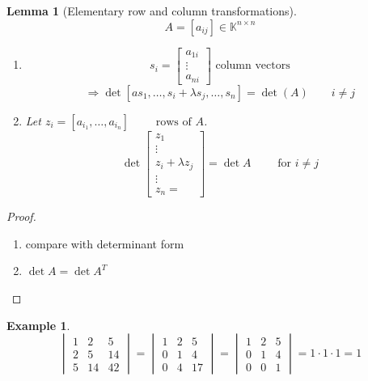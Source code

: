 \documentclass[a4paper,landscape,twocolumn]{article}
\newtheorem{ex}{Example}
\newtheorem{lemma}{Lemma}
\begin{document}
\begin{lemma}[Elementary row and column transformations]
  \label{lemma-7.33}
  \[ A = [a_{ij}] \in \mathbb K^{n \times n} \]
  \begin{enumerate}
    \item
      \[ s_i = \begin{bmatrix} a_{1i} \\ \vdots \\ a_{ni }\end{bmatrix} \text{ column vectors} \]
      \[ \Rightarrow \det[as_1, \ldots, s_i + \lambda s_j, \ldots, s_n] = \det(A) \qquad i \neq j \]
    \item
      Let $z_i = [a_{i_1}, \ldots, a_{i_n}] \qquad \text{ rows of $A$}$.
      \[ \det\begin{bmatrix} z_1 \\ \vdots \\ z_i + \lambda z_j \\ \vdots \\ z_n = \end{bmatrix} = \det{A} \qquad \text{ for } i \neq j \]
  \end{enumerate}
\end{lemma}
\begin{proof}
  \begin{enumerate}
    \item compare with determinant form
    \item $\det{A} = \det{A^T}$
  \end{enumerate}
\end{proof}

\begin{ex}
  \label{example-7.34}
  \[
    \begin{vmatrix}
      1 & 2 & 5 \\
      2 & 5 & 14 \\
      5 & 14 & 42
    \end{vmatrix}
    =
    \begin{vmatrix}
      1 & 2 & 5 \\
      0 & 1 & 4 \\
      0 & 4 & 17
    \end{vmatrix}
    =
    \begin{vmatrix}
      1 & 2 & 5 \\
      0 & 1 & 4 \\
      0 & 0 & 1
    \end{vmatrix}
    = 1 \cdot 1 \cdot 1
    = 1
  \]
\end{ex}
\end{document}
